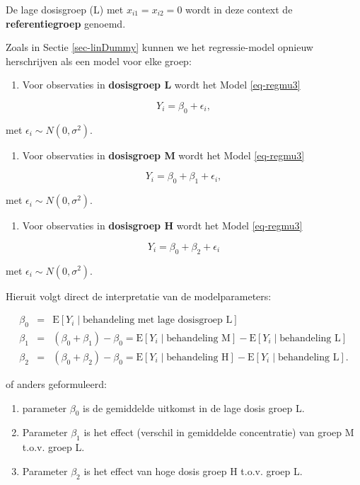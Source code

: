 \documentclass[
  dutch,
  letterpaper,
  12pt]{book}
\providecommand{\tightlist}{%
  \setlength{\itemsep}{0pt}\setlength{\parskip}{0pt}}
\theoremstyle{definition}
\theoremstyle{definition}
\theoremstyle{definition}
\theoremstyle{remark}
\begin{document}
De lage dosisgroep (L) met \(x_{i1}=x_{i2}=0\) wordt in deze context de
\textbf{referentiegroep} genoemd.

Zoals in Sectie \ref{sec-linDummy} kunnen we het regressie-model opnieuw
herschrijven als een model voor elke groep:

\begin{enumerate}
\def\labelenumi{\arabic{enumi}.}
\tightlist
\item
  Voor observaties in \textbf{dosisgroep L} wordt het Model
  \ref{eq-regmu3}
\end{enumerate}

\[Y_i = \beta_0+\epsilon_i,\]

met \(\epsilon_i \sim N(0,\sigma^2)\).

\begin{enumerate}
\def\labelenumi{\arabic{enumi}.}
\setcounter{enumi}{1}
\tightlist
\item
  Voor observaties in \textbf{dosisgroep M} wordt het Model
  \ref{eq-regmu3}
\end{enumerate}

\[Y_i = \beta_0+\beta_1 + \epsilon_i,\]

met \(\epsilon_i \sim N(0,\sigma^2)\).

\begin{enumerate}
\def\labelenumi{\arabic{enumi}.}
\setcounter{enumi}{2}
\tightlist
\item
  Voor observaties in \textbf{dosisgroep H} wordt het Model
  \ref{eq-regmu3}
\end{enumerate}

\[Y_i = \beta_0+\beta_2 + \epsilon_i\]

met \(\epsilon_i  \sim  N(0,\sigma^2)\).

Hieruit volgt direct de interpretatie van de modelparameters:

\begin{eqnarray*}
   \beta_0 &=&  \text{E}\left[Y_i \mid \text{behandeling met lage dosisgroep L}\right] \\
   \beta_1 &=&  (\beta_0+\beta_1)-\beta_0 = \text{E}\left[Y_i \mid \text{behandeling M}\right] - \text{E}\left[Y_i \mid \text{behandeling L}\right] \\
   \beta_2 &=&  (\beta_0+\beta_2)-\beta_0 = \text{E}\left[Y_i \mid \text{behandeling H}\right]-\text{E}\left[Y_i \mid \text{behandeling L}\right].
\end{eqnarray*}

of anders geformuleerd:

\begin{enumerate}
\def\labelenumi{\arabic{enumi}.}
\tightlist
\item
  parameter \(\beta_0\) is de gemiddelde uitkomst in de lage dosis groep
  L.
\item
  Parameter \(\beta_1\) is het effect (verschil in gemiddelde
  concentratie) van groep M t.o.v. groep L.
\item
  Parameter \(\beta_2\) is het effect van hoge dosis groep H t.o.v.
  groep L.
\end{enumerate}
\end{document}
